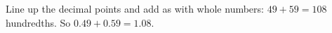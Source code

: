 Line up the decimal points and add as with whole numbers: $49+59=108$ hundredths. So $0.49+0.59=\boxed{1.08}$.
